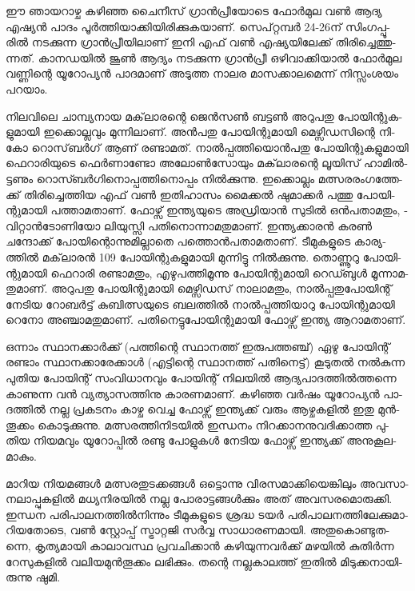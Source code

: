 \vskip 2pt

ഈ ഞാ­യ­റാ­ഴ്ച കഴി­ഞ്ഞ ചൈ­നീ­സ് ഗ്രാന്‍­പ്രീ­യോ­ടെ ­ഫോര്‍­മുല വണ്‍ ആദ്യ എഷ്യന്‍ പാ­ദം പൂര്‍­ത്തി­യാ­ക്കി­യി­രി­ക്കു­ക­യാ­ണ്. 
സെ­പ്റ്റ­മ്പര്‍ 24-26­ന് സിം­ഗ­പ്പൂ­രില്‍ നട­ക്കു­ന്ന ഗ്രാന്‍­പ്രീ­യി­ലാ­ണ് ഇനി എഫ് വണ്‍ എഷ്യ­യി­ലേ­ക്ക് തി­രി­ച്ചെ­ത്തു­ന്ന­ത്. 
കാ­ന­ഡ­യില്‍ ജൂണ്‍ ആദ്യം നട­ക്കു­ന്ന ­ഗ്രാന്‍­പ്രീ­ ഒഴി­വാ­ക്കി­യാല്‍ ഫോര്‍­മുല വണ്ണി­ന്റെ യൂ­റോ­പ്യന്‍ പാ­ദ­മാ­ണ് അടു­ത്ത 
നാ­ലര മാ­സ­ക്കാ­ല­മെ­ന്ന് നി­സ്സം­ശ­യം പറ­യാം­.

­നി­ല­വി­ലെ ചാ­മ്പ്യ­നായ മക്‌­ലാ­ര­ന്റെ ജെന്‍­സണ്‍ ബട്ടണ്‍ അറു­പ­തു പോ­യി­ന്റു­ക­ളു­മാ­യി ഇക്കൊ­ല്ല­വും മു­ന്നി­ലാ­ണ്. 
അന്‍­പ­തു പോ­യി­ന്റു­മാ­യി മെ­ഴ്സി­ഡ­സി­ന്റെ നി­കോ റൊ­സ്‌­ബര്‍­ഗ് ആണ് രണ്ടാ­മ­ത്. നാല്‍­പ്പ­ത്തി­യൊന്‍­പ­തു പോ­യി­ന്റു­ക­ളു­മാ­യി 
ഫെ­റാ­രി­യു­ടെ ഫെര്‍­ണാ­ണ്ടോ അലോണ്‍­സോ­യും മക്‌­ലാ­ര­ന്റെ ലൂ­യി­സ് ഹാ­മില്‍­ട്ട­ണും റൊ­സ്ബര്‍­ഗി­നൊ­പ്പ­ത്തി­നൊ­പ്പം 
നില്‍­ക്കു­ന്നു. ഇക്കൊ­ല്ലം മത്സ­ര­രം­ഗ­ത്തേ­ക്ക് തി­രി­ച്ചെ­ത്തിയ എഫ് വണ്‍ ഇതി­ഹാ­സം ­മൈ­ക്കല്‍ ഷു­മാ­ക്കര്‍ പത്തു 
പോ­യി­ന്റു­മാ­യി പത്താ­മ­താ­ണ്. ഫോ­ഴ്സ് ഇന്ത്യ­യു­ടെ അഡ്രി­യാന്‍ സു­ടില്‍ ഒന്‍­പ­താ­മ­തും, ­വി­റ്റാന്‍­ടോ­ണി­യോ ലി­യു­സ്സി­ 
പതി­നൊ­ന്നാ­മ­തു­മാ­ണ്. ഇന്ത്യ­ക്കാ­രന്‍ കരണ്‍ ചന്ദോ­ക്ക് പോ­യി­ന്റൊ­ന്നു­മി­ല്ലാ­തെ പത്തൊന്‍­പ­താ­മ­താ­ണ്. ടീ­മു­ക­ളു­ടെ 
കാ­ര്യ­ത്തില്‍ മക്‌­ലാ­രന്‍ 109 പോ­യി­ന്റു­ക­ളു­മാ­യി മു­ന്നി­ട്ടു നില്‍­ക്കു­ന്നു. തൊ­ണ്ണൂ­റു പോ­യി­ന്റു­മാ­യി ­ഫെ­റാ­രി­ രണ്ടാ­മ­തും, 
എഴു­പ­ത്തി­മൂ­ന്നു പോ­യി­ന്റു­മാ­യി ­റെ­ഡ്ബുള്‍ മൂ­ന്നാ­മ­തു­മാ­ണ്. അറു­പ­തു പോ­യി­ന്റു­മാ­യി മെ­ഴ്സി­ഡ­സ് നാ­ലാ­മ­തും, 
നാല്‍­പ്പ­തു­പോ­യി­ന്റ് നേ­ടിയ റോ­ബര്‍­ട്ട് കു­ബി­ത്സ­യു­ടെ ബല­ത്തില്‍ നാല്‍­പ്പ­ത്തി­യാ­റു പോ­യി­ന്റു­മാ­യി റെ­നോ 
അഞ്ചാ­മ­തു­മാ­ണ്. പതി­നെ­ട്ടു­പോ­യി­ന്റു­മാ­യി ഫോ­ഴ്സ് ഇന്ത്യ ആറാ­മ­താ­ണ്.

ഒ­ന്നാം സ്ഥാ­ന­ക്കാര്‍­ക്ക് (­പ­ത്തി­ന്റെ സ്ഥാ­ന­ത്ത് ഇരു­പ­ത്ത­ഞ്ച്) ഏഴു പോ­യി­ന്റ് രണ്ടാം സ്ഥാ­ന­ക്കാ­രേ­ക്കാള്‍ (എ­ട്ടി­ന്റെ 
സ്ഥാ­ന­ത്ത് പതി­നെ­ട്ട്) ­കൂ­ടു­തല്‍ നല്‍­കു­ന്ന പു­തിയ പോ­യി­ന്റ് സം­വി­ധാ­ന­വും പോ­യി­ന്റ് നി­ല­യില്‍ ആദ്യ­പാ­ദ­ത്തില്‍­ത്ത­ന്നെ 
കാ­ണു­ന്ന വന്‍ വ്യ­ത്യാ­സ­ത്തി­നു കാ­ര­ണ­മാ­ണ്. കഴി­ഞ്ഞ വര്‍­ഷം യൂ­റോ­പ്യന്‍ പാ­ദ­ത്തില്‍ നല്ല പ്ര­ക­ട­നം കാ­ഴ്ച വെ­ച്ച 
ഫോ­ഴ്സ് ഇന്ത്യ­ക്ക് വരും ആഴ്ച­ക­ളില്‍ ഇതു മുന്‍­തൂ­ക്കം കൊ­ടു­ക്കു­ന്നു. മത്സ­ര­ത്തി­നി­ട­യില്‍ ഇന്ധ­നം നി­റ­ക്കാ­ന­നു­വ­ദി­ക്കാ­ത്ത 
പു­തിയ നി­യ­മ­വും യൂ­റോ­പ്പില്‍ രണ്ടു പോ­ളു­കള്‍ നേ­ടിയ ഫോ­ഴ്സ് ഇന്ത്യ­ക്ക് അനു­കൂ­ല­മാ­കും.

­മാ­റിയ നി­യ­മ­ങ്ങള്‍ മത്സ­ര­തു­ട­ക്ക­ങ്ങള്‍ ഒട്ടൊ­ന്നു വി­ര­സ­മാ­ക്കി­യെ­ങ്കി­ലും അവ­സാ­ന­ലാ­പ്പു­ക­ളില്‍ മധ്യ­നി­ര­യില്‍ നല്ല 
പോ­രാ­ട്ട­ങ്ങള്‍­ക്കും അത് അവ­സ­ര­മൊ­രു­ക്കി. ഇന്ധന പരി­പാ­ല­ന­ത്തില്‍­നി­ന്നും ടീ­മു­ക­ളു­ടെ ശ്ര­ദ്ധ ടയര്‍ 
പരി­പാ­ല­ന­ത്തി­ലേ­ക്കു­മാ­റി­യ­തോ­ടെ, വണ്‍ സ്റ്റോ­പ്പ് സ്ട്രാ­റ്റ­ജി സര്‍‌­വ്വ സാ­ധാ­ര­ണ­മാ­യി. അതു­കൊ­ണ്ടു­ത­ന്നെ, കൃ­ത്യ­മാ­യി 
കാ­ലാ­വ­സ്ഥ പ്ര­വ­ചി­ക്കാന്‍ കഴി­യു­ന്ന­വര്‍­ക്ക് മഴ­യില്‍ കു­തിര്‍­ന്ന റേ­സു­ക­ളില്‍ വലി­യ­മുന്‍­തൂ­ക്കം ലഭി­ക്കും. തന്റെ നല്ല­കാ­ല­ത്ത് 
ഇതില്‍ മി­ടു­ക്ക­നാ­യി­രു­ന്നു ഷു­മി.

